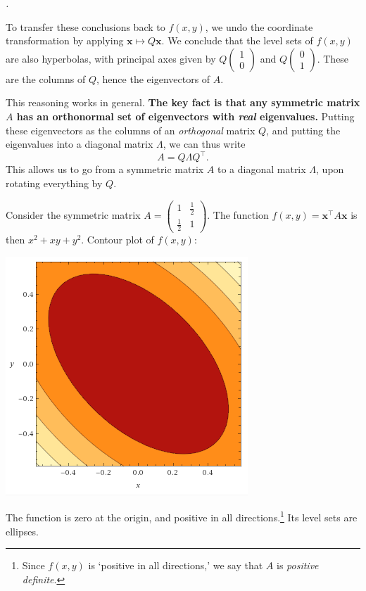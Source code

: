 \documentclass[10pt]{amsart}
\makeatletter
\renewenvironment{proof}[1][\proofname]{\par
	\pushQED{\qed}%
	\normalfont \topsep6\p@\@plus6\p@\relax
	\noindent\emph{#1.} 
	\ignorespaces
}{%
\popQED\endtrivlist\@endpefalse
}
\theoremstyle{mythm}
\theoremstyle{definition}
\theoremstyle{myrmk}
\newenvironment{myproof}{\color{myblue}\begin{proof}}{\end{proof}}
\makeatother
\begin{document}
\begin{myproof}
		To transfer these conclusions back to $f(x, y)$, we undo the coordinate transformation by applying $\bm{x} \mapsto Q\bm{x}$. We conclude that the level sets of $f(x, y)$ are also hyperbolas, with principal axes given by $Q \begin{pmatrix}
		1 \\ 0 
		\end{pmatrix}$ and $Q \begin{pmatrix}
		0 \\ 1
		\end{pmatrix}$. These are the columns of $Q$, hence the eigenvectors of $A$. 	
	\end{myproof}
	
	This reasoning works in general. \textbf{The key fact is that any symmetric matrix $A$ has an orthonormal set of eigenvectors with \emph{real} eigenvalues. } Putting these eigenvectors as the columns of an \emph{orthogonal} matrix $Q$, and putting the eigenvalues into a diagonal matrix $\Lambda$, we can thus write 
	\[
		A = Q \Lambda Q^\top. 
	\]
	This allows us to go from a symmetric matrix $A$ to a diagonal matrix $\Lambda$, upon rotating everything by $Q$. 
	
	Consider the symmetric matrix $A = \begin{pmatrix}
	1 & \frac12 \\
	\frac12 & 1
	\end{pmatrix}$. The function $f(x, y) = \bm{x}^\top A \bm{x}$ is then $x^2 + xy + y^2$. Contour plot of $f(x, y)$: 
	\begin{center}
		\includegraphics{rec10-pic2}
	\end{center}
	The function is zero at the origin, and positive in all directions.\footnote{Since $f(x, y)$ is `positive in all directions,' we say that $A$ is \emph{positive definite}.} Its level sets are ellipses. 
	
\end{document}

